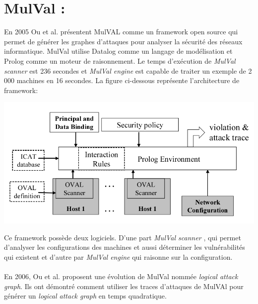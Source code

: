 \documentclass[10pt,a4paper]{article}
\begin{document}
\section{MulVal :}
En 2005 Ou et al. présentent MulVAL\cite{ref1} comme un framework open source qui permet de générer les graphes d'attaques pour analyser la sécurité des réseaux informatique. MulVal utilise Datalog comme un langage de modélisation et Prolog comme un moteur de raisonnement. Le temps d'exécution de \textit{MulVal scanner} est 236 secondes et \textit{MulVal engine} est capable de traiter un exemple de 2 000 machines en 16 secondes. La figure ci-dessous représente l'architecture de framework:
\begin{center}
\includegraphics[scale=0.3]{img/MulVal.png}
\end{center}

Ce framework possède deux logiciels. D'une part \textit{MulVal scanner} , qui permet d'analyser les configurations des machines et aussi déterminer les vulnérabilités qui existent et d'autre 	par \textit{MulVal engine} qui raisonne sur la configuration.
\paragraph{}
En 2006, Ou et al. proposent une évolution de MulVal nommée \textit{logical attack graph}\cite{ref6}. Ils ont démontré comment utiliser les traces d'attaques de MulVAl pour générer un \textit{logical attack graph} en temps quadratique.
\end{document}
